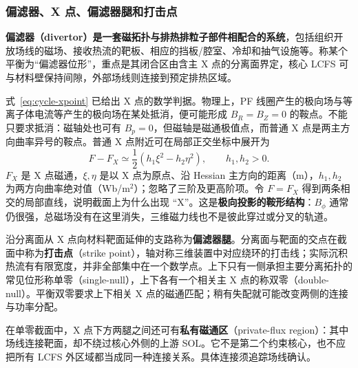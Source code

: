 \documentclass[12pt,fontset=none]{ctexart}
\numberwithin{equation}{section}
\numberwithin{table}{section}
\numberwithin{figure}{section}
\begin{document}
\subsubsection{偏滤器、X 点、偏滤器腿和打击点}

\textbf{偏滤器（divertor）是一套磁拓扑与排热排粒子部件相配合的系统}，包括组织开放场线的磁场、接收热流的靶板、相应的挡板/腔室、冷却和抽气设施等。称某个平衡为``偏滤器位形''，重点是其闭合区由含主 X 点的分离面界定，核心 LCFS 可与材料壁保持间隙，外部场线则连接到预定排热区域。

式~\eqref{eq:cycle-xpoint} 已给出 X 点的数学判据。物理上，PF 线圈产生的极向场与等离子体电流等产生的极向场在某处抵消，便可能形成 $B_R=B_Z=0$ 的鞍点。不能只要求抵消：磁轴处也可有 $B_p=0$，但磁轴是磁通极值点，而普通 X 点是两主方向曲率异号的鞍点。普通 X 点附近可在局部正交坐标中展开为
\begin{equation}\label{eq:edge-xlocal}
 F-F_X\simeq\frac12(h_1\xi^2-h_2\eta^2),\qquad h_1,h_2>0 .
\end{equation}
$F_X$ 是 X 点磁通，$\xi,\eta$ 是以 X 点为原点、沿 Hessian 主方向的距离（m），$h_1,h_2$ 为两方向曲率绝对值（Wb/m$^2$）；忽略了三阶及更高阶项。令 $F=F_X$ 得到两条相交的局部直线，说明截面上为什么出现 ``X''。这是\textbf{极向投影的鞍形结构}：$B_\phi$ 通常仍很强，总磁场没有在这里消失，三维磁力线也不是彼此穿过或分叉的轨道。

沿分离面从 X 点向材料靶面延伸的支路称为\textbf{偏滤器腿}。分离面与靶面的交点在截面中称为\textbf{打击点}（strike point），轴对称三维装置中对应绕环的打击线；实际沉积热流有有限宽度，并非全部集中在一个数学点。上下只有一侧承担主要分离拓扑的常见位形称单零（single-null），上下各有一个相关主 X 点的称双零（double-null）。平衡双零要求上下相关 X 点的磁通匹配；稍有失配就可能改变两侧的连接与功率分配。

在单零截面中，X 点下方两腿之间还可有\textbf{私有磁通区}（private-flux region）：其中场线连接靶面，却不绕过核心外侧的上游 SOL。它不是第二个约束核心，也不应把所有 LCFS 外区域都当成同一种连接关系。具体连接须追踪场线确认。
\end{document}
